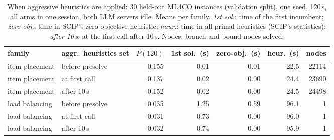 \begin{table}[t]\centering\small
\begin{tabular}{llrrrrr}
\toprule
family & aggr.\ heuristics set & $P(120)$ & 1st sol.\ (s) & zero-obj.\ (s) & heur.\ (s) & nodes \\
\midrule
item placement & before presolve & 0.155 & 0.01 & 0.01 & 22.5 & 22114 \\
item placement & at first call & 0.137 & 0.02 & 0.00 & 24.4 & 23690 \\
item placement & after 10\,s & 0.152 & 0.02 & 0.00 & 24.5 & 24498 \\
\midrule
load balancing & before presolve & 0.035 & 1.25 & 0.59 & 96.1 & 1 \\
load balancing & at first call & 0.031 & 0.73 & 0.00 & 96.0 & 1 \\
load balancing & after 10\,s & 0.032 & 0.74 & 0.00 & 95.9 & 1 \\
\bottomrule
\end{tabular}
\caption{When aggressive heuristics are applied: 30 held-out ML4CO instances (validation split), one seed, 120\,s, all arms in one session, both LLM servers idle. Means per family. \emph{1st sol.}: time of the first incumbent; \emph{zero-obj.}: time in SCIP's zero-objective heuristic; \emph{heur.}: time in all primal heuristics (SCIP's statistics); \emph{after 10\,s}: at the first call after 10\,s. Nodes: branch-and-bound nodes solved.}\label{tab:timingmech}
\end{table}